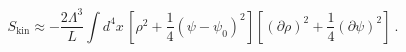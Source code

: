 \begin{equation}
\label{Skin_0}
  S_{\mathrm{kin}} \approx -\frac{2\Lambda^3}{L} \int d^4
   x\, \left[ \rho^2 +\frac14(\psi-\psi_0)^2 \right]  
  \left[ (\partial \rho)^2 +\frac14 (\partial \psi)^2 \right]~.
\end{equation}

